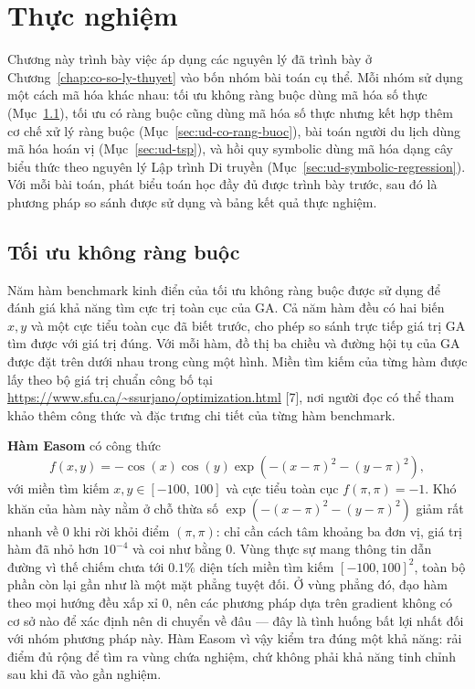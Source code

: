 \chapter{Thực nghiệm}
\label{chap:ung-dung}

Chương này trình bày việc áp dụng các nguyên lý đã trình bày ở
Chương~\ref{chap:co-so-ly-thuyet} vào bốn nhóm bài toán cụ thể. Mỗi
nhóm sử dụng một cách mã hóa khác nhau: tối ưu không ràng buộc dùng mã
hóa số thực (Mục~\ref{sec:ud-khong-rang-buoc}), tối ưu có ràng buộc
cũng dùng mã hóa số thực nhưng kết hợp thêm cơ chế xử lý ràng buộc
(Mục~\ref{sec:ud-co-rang-buoc}), bài toán người du lịch dùng mã hóa
hoán vị (Mục~\ref{sec:ud-tsp}), và hồi quy symbolic dùng mã hóa dạng cây
biểu thức theo nguyên lý Lập trình Di truyền
(Mục~\ref{sec:ud-symbolic-regression}). Với mỗi bài toán, phát biểu
toán học đầy đủ được trình bày trước, sau đó là phương pháp so sánh
được sử dụng và bảng kết quả thực nghiệm.

\section{Tối ưu không ràng buộc}
\label{sec:ud-khong-rang-buoc}

Năm hàm benchmark kinh điển của tối ưu không ràng buộc được sử dụng để
đánh giá khả năng tìm cực trị toàn cục của GA. Cả năm hàm đều có hai
biến $x, y$ và một cực tiểu toàn cục đã biết trước, cho phép so sánh
trực tiếp giá trị GA tìm được với giá trị đúng. Với mỗi hàm, đồ thị ba
chiều và đường hội tụ của GA được đặt trên dưới nhau trong cùng một
hình. Miền tìm kiếm của từng hàm được lấy theo bộ giá trị chuẩn công bố
tại \url{https://www.sfu.ca/~ssurjano/optimization.html} [7], nơi người
đọc có thể tham khảo thêm công thức và đặc trưng chi tiết của từng hàm
benchmark.

\vspace{1em}

\textbf{Hàm Easom} có công thức
\begin{equation}
f(x,y) = -\cos(x)\cos(y)\exp\!\left(-(x-\pi)^2-(y-\pi)^2\right),
\label{eq:easom}
\end{equation}
với miền tìm kiếm $x, y \in [-100,\, 100]$ và cực tiểu toàn cục
$f(\pi,\pi) = -1$. Khó khăn của hàm này nằm ở chỗ thừa số
$\exp(-(x-\pi)^2-(y-\pi)^2)$ giảm rất nhanh về $0$ khi rời khỏi điểm
$(\pi,\pi)$: chỉ cần cách tâm khoảng ba đơn vị, giá trị hàm đã nhỏ hơn
$10^{-4}$ và coi như bằng $0$. Vùng thực sự mang thông tin dẫn đường vì
thế chiếm chưa tới $0.1\%$ diện tích miền tìm kiếm $[-100,100]^2$,
toàn bộ phần còn lại gần như là một mặt phẳng tuyệt đối. Ở vùng phẳng
đó, đạo hàm theo mọi hướng đều xấp xỉ $0$, nên các phương pháp dựa trên
gradient không có cơ sở nào để xác định nên di chuyển về đâu --- đây là
tình huống bất lợi nhất đối với nhóm phương pháp này. Hàm Easom vì vậy
kiểm tra đúng một khả năng: rải điểm đủ rộng để tìm ra vùng chứa
nghiệm, chứ không phải khả năng tinh chỉnh sau khi đã vào gần nghiệm.

